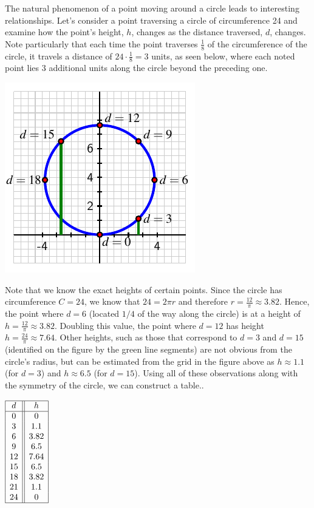 \documentclass[nooutcomes]{ximera}
\begin{document}
The natural phenomenon of a point moving around a circle leads to interesting relationships. Let's consider a point traversing a circle of circumference 24 and examine how the point's height, $h$, changes as the distance traversed, $d$, changes. Note particularly that each time the point traverses $\frac{1}{8}$ of the circumference of the circle, it travels a distance of $24 \cdot \frac{1}{8} = 3$ units, as seen below, where each noted point lies 3 additional units along the circle beyond the preceding one.


\begin{image}
\includegraphics[scale=.3]{traversing-first-example.pdf}
\end{image}


Note that we know the exact heights of certain points. Since the circle has circumference $C = 24$, we know that $24 = 2\pi r$ and therefore $r = \frac{12}{\pi} \approx 3.82$.  Hence, the point where $d = 6$ (located $1/4$ of the way along the circle) is at a height of $h = \frac{12}{\pi} \approx 3.82$.  Doubling this value, the point where $d = 12$ has height $h = \frac{24}{\pi} \approx 7.64$.  Other heights, such as those that correspond to $d = 3$ and $d = 15$ (identified on the figure by the green line segments) are not obvious from the circle's radius, but can be estimated from the grid in the figure above as $h \approx 1.1$ (for $d = 3$) and $h \approx 6.5$ (for $d = 15$).  Using all of these observations along with the symmetry of the circle, we can construct a table..

\begin{center}
$
\begin{array}{ |c || c|  }
 \hline
 d & h\\
 \hline
 0&0\\
 3&1.1\\
 6&3.82\\
 9&6.5\\
 12&7.64\\
 15&6.5\\
 18&3.82\\
 21&1.1\\
 24&0\\
 \hline
\end{array}
$
\end{center}
\end{document}
